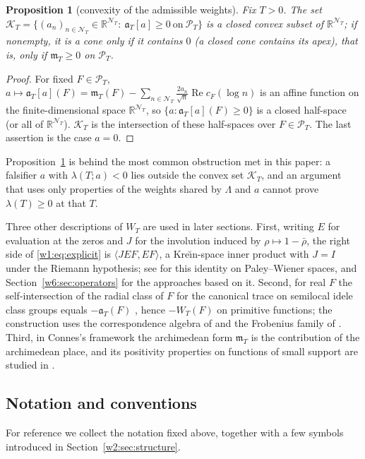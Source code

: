 \documentclass[11pt]{amsart}
\newtheorem{proposition}[theorem]{Proposition}
\theoremstyle{definition}
\theoremstyle{remark}
\numberwithin{equation}{section}
\newcommand{\R}{\mathbb{R}}
\DeclareMathOperator{\Rel}{Re}
\newcommand{\cF}{c_F}                                  %
\newcommand{\PT}{\mathcal{P}_T}                        %
\newcommand{\NT}{\mathcal{N}_T}                        %
\newcommand{\mT}{\mathfrak{m}_T}                       %
\newcommand{\aT}{\mathfrak{a}_T}                       %
\newcommand{\WT}{W_T}                                  %
\newcommand{\lam}{\lambda(T)}                          %
\begin{document}
\begin{proposition}[convexity of the admissible weights]\label{w1:prop:convex}
Fix $T>0$. The set
$\mathcal K_T=\{(a_n)_{n\in\NT}\in\R^{\NT}:\ \aT[a]\ge0\ \text{on}\ \PT\}$
is a closed convex subset of $\R^{\NT}$; if nonempty, it is a cone only if it
contains $0$ (a closed cone contains its apex), that is, only if $\mT\ge0$ on $\PT$.
\end{proposition}

\begin{proof}
For fixed $F\in\PT$, $a\mapsto\aT[a](F)=\mT(F)-\sum_{n\in\NT}\frac{2a_n}{\sqrt n}\Rel\cF(\log n)$
is an affine function on the finite-dimensional space $\R^{\NT}$, so
$\{a:\aT[a](F)\ge0\}$ is a closed half-space (or all of $\R^{\NT}$).
$\mathcal K_T$ is the intersection of these half-spaces over $F\in\PT$.
The last assertion is the case $a=0$.
\end{proof}

Proposition~\ref{w1:prop:convex} is behind the most common obstruction met
in this paper: a falsifier $a$ with $\lambda(T;a)<0$ lies outside the convex
set $\mathcal K_T$, and an argument that uses only properties of the weights
shared by $\Lambda$ and $a$ cannot prove $\lam\ge0$ at that $T$.

Three other descriptions of $\WT$ are used in later sections. First, writing
$E$ for evaluation at the zeros and $J$ for the involution induced by
$\rho\mapsto1-\bar\rho$, the right side of \eqref{w1:eq:explicit} is
$\langle JEF,EF\rangle$, a Kre\u{\i}n-space inner product with $J=I$ under the
Riemann hypothesis; see \cite[Proposition~6.1]{P08} for this identity on
Paley--Wiener spaces, and Section~\ref{w6:sec:operators} for the approaches
based on it. Second, for real $F$ the self-intersection of the radial class of
$F$ for the canonical trace on semilocal idele class groups equals $-\aT(F)$
\cite[Theorem~4.1(ii)]{P45}, hence $-\WT(F)$ on primitive functions; the
construction uses the correspondence algebra of \cite{P43} and the Frobenius
family of \cite{P44}. Third, in Connes's framework \cite{Connes1999} the
archimedean form $\mT$ is the contribution of the archimedean place, and its
positivity properties on functions of small support are studied in
\cite{ConnesConsani2021}.

\subsection{Notation and conventions}\label{w1:subsec:notation}
For reference we collect the notation fixed above, together with a few symbols
introduced in Section~\ref{w2:sec:structure}.
\end{document}
